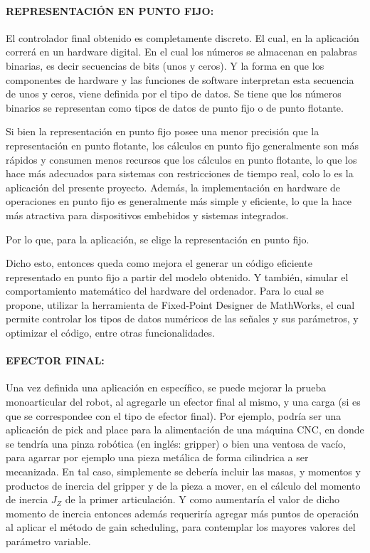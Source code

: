 \documentclass{article}
\begin{document}
\begin{sloppypar}
\paragraph{REPRESENTACIÓN EN PUNTO FIJO:}
\label{sec:REPRESENTACIÓN EN PUNTO FIJO:}
\hfill

El controlador final obtenido es completamente discreto. El cual, en la aplicación correrá en un hardware digital. En el cual los números se almacenan en palabras binarias, es decir secuencias de bits (unos y ceros). Y la forma en que los componentes de hardware y las funciones de software interpretan esta secuencia de unos y ceros, viene definida por el tipo de datos. Se tiene que los números binarios se representan como tipos de datos de punto fijo o de punto flotante.

Si bien la representación en punto fijo posee una menor precisión que la representación en punto flotante, los cálculos en punto fijo generalmente son más rápidos y consumen menos recursos que los cálculos en punto flotante, lo que los hace más adecuados para sistemas con restricciones de tiempo real, colo lo es la aplicación del presente proyecto. Además, la implementación en hardware de operaciones en punto fijo es generalmente más simple y eficiente, lo que la hace más atractiva para dispositivos embebidos y sistemas integrados.

Por lo que, para la aplicación, se elige la representación en punto fijo.

Dicho esto, entonces queda como mejora el generar un código eficiente representado en punto fijo a partir del modelo obtenido. Y también, simular el comportamiento matemático del hardware del ordenador. Para lo cual se propone, utilizar la herramienta de Fixed-Point Designer de MathWorks, el cual permite controlar los tipos de datos numéricos de las señales y sus parámetros, y optimizar el código, entre otras funcionalidades.


\paragraph{EFECTOR FINAL:}
\label{sec:EFECTOR FINAL:}
\hfill

Una vez definida una aplicación en específico, se puede mejorar la prueba monoarticular del robot, al agregarle un efector final al mismo, y una carga (si es que se correspondee con el tipo de efector final). Por ejemplo, podría ser una aplicación de pick and place para la alimentación de una máquina CNC, en donde se tendría una pinza robótica (en inglés: gripper) o bien una ventosa de vacío, para agarrar por ejemplo una pieza metálica de forma cilindrica a ser mecanizada. En tal caso, simplemente se debería incluir las masas, y momentos y productos de inercia del gripper y de la pieza a mover, en el cálculo del momento de inercia $J_Z$ de la primer articulación. Y como aumentaría el valor de dicho momento de inercia entonces además requeriría agregar más puntos de operación al aplicar el método de gain scheduling, para contemplar los mayores valores del parámetro variable.



\end{sloppypar}
\end{document}
